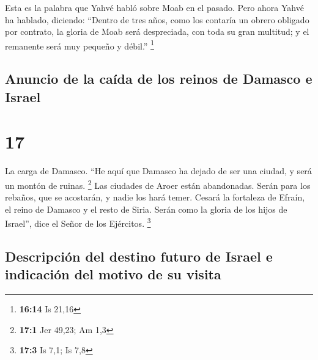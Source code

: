  Esta es la palabra que Yahvé habló sobre Moab en el
pasado.  Pero ahora Yahvé ha hablado, diciendo: ``Dentro
de tres años, como los contaría un obrero obligado por contrato, la
gloria de Moab será despreciada, con toda su gran multitud; y el
remanente será muy pequeño y débil.'' \footnote{\textbf{16:14} Is 21,16}

\hypertarget{anuncio-de-la-cauxedda-de-los-reinos-de-damasco-e-israel}{%
\subsection{Anuncio de la caída de los reinos de Damasco e
Israel}\label{anuncio-de-la-cauxedda-de-los-reinos-de-damasco-e-israel}}

\hypertarget{section-16}{%
\section{17}\label{section-16}}

 La carga de Damasco. ``He aquí que Damasco ha dejado de
ser una ciudad, y será un montón de ruinas. \footnote{\textbf{17:1} Jer
  49,23; Am 1,3}  Las ciudades de Aroer están abandonadas.
Serán para los rebaños, que se acostarán, y nadie los hará temer.
 Cesará la fortaleza de Efraín, el reino de Damasco y el
resto de Siria. Serán como la gloria de los hijos de Israel'', dice el
Señor de los Ejércitos. \footnote{\textbf{17:3} Is 7,1; Is 7,8}

\hypertarget{descripciuxf3n-del-destino-futuro-de-israel-e-indicaciuxf3n-del-motivo-de-su-visita}{%
\subsection{Descripción del destino futuro de Israel e indicación del
motivo de su
visita}\label{descripciuxf3n-del-destino-futuro-de-israel-e-indicaciuxf3n-del-motivo-de-su-visita}}


